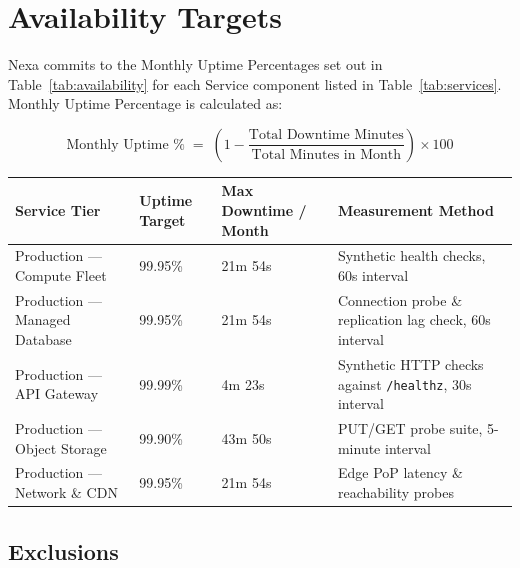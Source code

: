 
\section{Availability Targets}
\label{sec:availability}

Nexa commits to the Monthly Uptime Percentages set out in Table~\ref{tab:availability} for
each Service component listed in Table~\ref{tab:services}. Monthly Uptime Percentage is
calculated as:

\begin{center}
\begin{tcolorbox}[
  enhanced, colback=PaleSlate, colframe=SteelBlue,
  boxrule=0.6pt, arc=4pt, width=0.9\linewidth,
  top=8pt, bottom=8pt, left=12pt, right=12pt
]
\centering
\[
  \text{Monthly Uptime \%} \;=\; \left(1 - \frac{\text{Total Downtime Minutes}}{\text{Total Minutes in Month}}\right) \times 100
\]
\end{tcolorbox}
\end{center}

\vspace{4pt}
\begin{tabularx}{\linewidth}{@{} L{4.4cm} C{2.9cm} C{3.1cm} X @{}}
  \toprule
  \textbf{Service Tier} & \textbf{Uptime Target} & \textbf{Max Downtime / Month} & \textbf{Measurement Method} \\
  \midrule
  Production --- Compute Fleet    & 99.95\% & 21m 54s  & Synthetic health checks, 60s interval \\
  Production --- Managed Database & 99.95\% & 21m 54s  & Connection probe \& replication lag check, 60s interval \\
  Production --- API Gateway      & 99.99\% & 4m 23s   & Synthetic HTTP checks against \texttt{/healthz}, 30s interval \\
  Production --- Object Storage   & 99.90\% & 43m 50s  & PUT/GET probe suite, 5-minute interval \\
  Production --- Network \& CDN   & 99.95\% & 21m 54s  & Edge PoP latency \& reachability probes \\
  \bottomrule
\end{tabularx}
\label{tab:availability}

\subsection{Exclusions}

